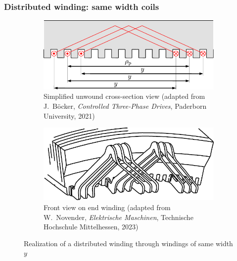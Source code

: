 \begin{frame}
	\frametitle{Distributed winding: same width coils}
    \begin{figure}
		\centering
		\begin{subfigure}[b]{0.49\textwidth}
			\centering
			\includegraphics[height=0.35\textheight]{fig/lec05/Distributed_winding_same_width_01.pdf}
			\caption{Simplified unwound cross-section view (adapted from J.~B\"ocker, \textit{Controlled Three-Phase Drives}, Paderborn University, 2021)}
		\end{subfigure}
		\hfill
		\begin{subfigure}[b]{0.49\textwidth}
			\centering
			\includegraphics[height=0.35\textheight]{fig/lec05/Distributed_winding_same_width_02.pdf}
			\caption{Front view on end winding  (adapted from W.~Novender, \textit{Elektrische Maschinen}, Technische Hochschule Mittelhessen, 2023)}
		\end{subfigure}
		\caption{Realization of a distributed winding through windings of same width $y$} 
        \label{fig:Distributed_winding_same_width}
	\end{figure}
\end{frame}

